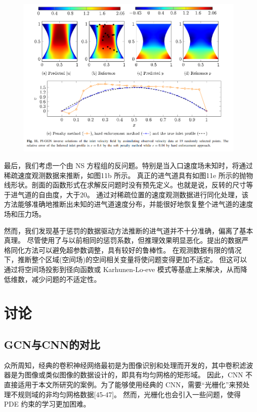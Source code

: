 \begin{figure}[h]  
    \centering  
    \includegraphics[width=\textwidth]{./pics/p11.png}  
\end{figure}

最后，我们考虑一个由 NS 方程组的反问题。特别是当入口速度场未知时，将通过稀疏速度观测数据来推断，如图11b 所示。
真正的进气道具有如图11e 所示的抛物线形状。剖面的函数形式在求解反问题时没有预先定义。也就是说，反转的尺寸等于进气道的自由度，大于20。
通过对稀疏位置的速度观测数据进行同化处理，该方法能够准确地推断出未知的进气道速度分布，并能很好地恢复整个进气道的速度场和压力场。

然而，我们发现基于惩罚的数据驱动方法推断的进气道并不十分准确，偏离了基本真理。
尽管使用了与以前相同的惩罚系数，但推理效果明显恶化。提出的数据严格同化方法可以避免超参数调整，具有较好的鲁棒性。
在观测数据有限的情况下，推断整个区域(空间场)的空间相关变量将使问题变得更加不适定。
但这可以通过将空间场投影到径向函数或 Karhunen-Lo-eve 模式等基底上来解决，从而降低维数，减少问题的不适定性。

\section{讨论}
\subsection{GCN与CNN的对比}
众所周知，经典的卷积神经网络最初是为图像识别和处理而开发的，其中卷积滤波器是为图像或类似图像的数据设计的，即具有均匀网格的矩形域。
因此，CNN 不直接适用于本文所研究的案例。为了能够使用经典的 CNN，需要“光栅化”来预处理不规则域的非均匀网格数据[45-47]。
然而，光栅化也会引入一些问题，使得 PDE 约束的学习更加困难。

